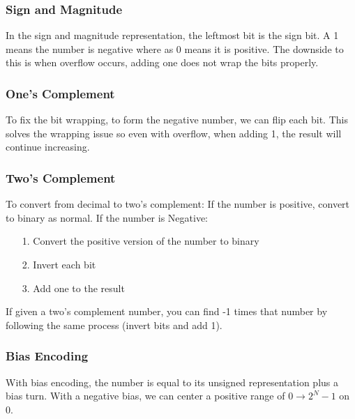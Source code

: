 \documentclass{article}
\begin{document}
\subsubsection{Sign and Magnitude}
In the sign and magnitude representation, the leftmost bit is the sign bit.
A 1 means the number is negative where as 0 means it is positive. The downside to this is when overflow occurs, adding one does not wrap the bits properly.
\subsubsection{One's Complement}
To fix the bit wrapping, to form the negative number, we can flip each bit. This solves the wrapping issue so even with overflow, when adding 1, the result will continue increasing.
\subsubsection{Two's Complement}
To convert from decimal to two's complement:
If the number is positive, convert to binary as normal.
If the number is Negative:
\begin{itemize}
    \item[1.] Convert the positive version of the number to binary
    \item[2.] Invert each bit
    \item[3.] Add one to the result
\end{itemize}
If given a two's complement number, you can find -1 times that number by following the same process (invert bits and add 1).
\subsubsection{Bias Encoding}
With bias encoding, the number is equal to its unsigned representation plus a bias turn. With a negative bias,
we can center a positive range of $0 \rightarrow 2^N - 1$ on 0.
\end{document}
